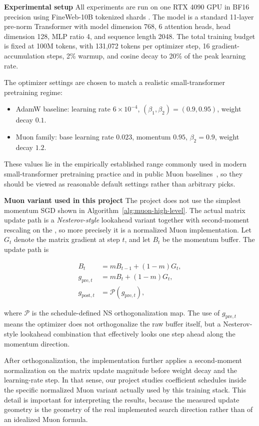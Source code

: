 \documentclass[10pt]{article}
\begin{document}
\textbf{Experimental setup}
All experiments are run on one RTX 4090 GPU in BF16 precision using FineWeb-10B tokenized shards \citep{penedo2024fineweb}. The model is a standard 11-layer pre-norm Transformer with model dimension 768, 6 attention heads, head dimension 128, MLP ratio 4, and sequence length 2048. The total training budget is fixed at 100M tokens, with 131{,}072 tokens per optimizer step, 16 gradient-accumulation steps, 2\% warmup, and cosine decay to 20\% of the peak learning rate.

The optimizer settings are chosen to match a realistic small-transformer pretraining regime:

\begin{itemize}
    \item AdamW baseline: learning rate $6\times 10^{-4}$, $(\beta_1,\beta_2)=(0.9,0.95)$, weight decay $0.1$.
    \item Muon family: base learning rate $0.023$, momentum $0.95$, $\beta_2=0.9$, weight decay $1.2$.
\end{itemize}

These values lie in the empirically established range commonly used in modern small-transformer pretraining practice and in public Muon baselines~\cite{moddednanogpt2024}, so they should be viewed as reasonable default settings rather than arbitrary picks.

\textbf{Muon variant used in this project}
The project does not use the simplest momentum SGD shown in Algorithm~\ref{alg:muon-high-level}. The actual matrix update path is a \emph{Nesterov-style} lookahead variant together with second-moment rescaling on the , so more precisely it is a normalized Muon implementation. Let $G_t$ denote the matrix gradient at step $t$, and let $B_t$ be the momentum buffer. The update path is

\begin{align}
    B_t &= m B_{t-1} + (1-m) G_t, \\
    g_{\mathrm{pre},t} &= m B_t + (1-m) G_t, \\
    g_{\mathrm{post},t} &= \mathcal{P}(g_{\mathrm{pre},t}),
\end{align}

where $\mathcal{P}$ is the schedule-defined NS orthogonalization map. The use of $g_{\mathrm{pre},t}$ means the optimizer does not orthogonalize the raw buffer itself, but a Nesterov-style lookahead combination that effectively looks one step ahead along the momentum direction.

After orthogonalization, the implementation further applies a second-moment normalization on the matrix update magnitude before weight decay and the learning-rate step. In that sense, our project studies coefficient schedules inside the specific normalized Muon variant actually used by this training stack. This detail is important for interpreting the results, because the measured update geometry is the geometry of the real implemented search direction rather than of an idealized Muon formula.
\end{document}
